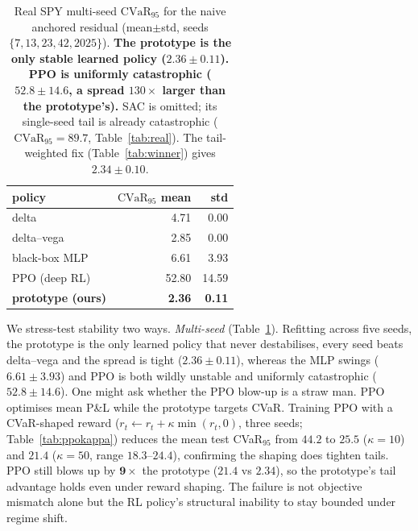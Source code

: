 \documentclass[sigconf,anonymous]{acmart}
\begin{document}
\begin{table}[t]
\centering
\caption{Real SPY multi-seed $\mathrm{CVaR}_{95}$ for the naive anchored residual
(mean$\pm$std, seeds $\{7,13,23,42,2025\}$). \textbf{The prototype is the only
stable learned policy ($2.36\pm0.11$). PPO is uniformly catastrophic
($52.8\pm14.6$, a spread $130\times$ larger than the prototype's).}
SAC is omitted; its single-seed tail is already catastrophic
($\mathrm{CVaR}_{95}=89.7$, Table~\ref{tab:real}).
The tail-weighted fix (Table~\ref{tab:winner}) gives $2.34\pm0.10$.}
\label{tab:multiseed}
\small
\begin{tabular}{lrr}
\toprule
policy & $\mathrm{CVaR}_{95}$ mean & std \\
\midrule
delta          & 4.71  & 0.00 \\
delta--vega    & 2.85  & 0.00 \\
black-box MLP  & 6.61  & 3.93 \\
PPO (deep RL)  & 52.80 & 14.59 \\
\textbf{prototype (ours)} & \textbf{2.36} & \textbf{0.11} \\
\bottomrule
\end{tabular}
\end{table}

We stress-test stability two ways. \emph{Multi-seed}
(Table~\ref{tab:multiseed}). Refitting across five seeds, the prototype is the only
learned policy that never destabilises, every seed beats delta--vega and the spread
is tight ($2.36\pm0.11$), whereas the MLP swings ($6.61\pm3.93$) and PPO is both
wildly unstable and uniformly catastrophic ($52.8\pm14.6$). One might ask whether
the PPO blow-up is a straw man. PPO optimises mean P\&L while the prototype targets
CVaR. Training PPO with a CVaR-shaped reward ($r_t \leftarrow r_t + \kappa \min(r_t,0)$,
three seeds; Table~\ref{tab:ppokappa}) reduces the mean test CVaR$_{95}$ from $44.2$
to $25.5$ ($\kappa=10$) and $21.4$ ($\kappa=50$, range $18.3$--$24.4$), confirming the
shaping does tighten tails. PPO still blows up by $\mathbf{9\times}$ the prototype
($21.4$ vs $2.34$), so the prototype's tail advantage holds even under reward shaping. The failure is not objective
mismatch alone but the RL policy's structural inability to stay bounded under
regime shift.
\end{document}
